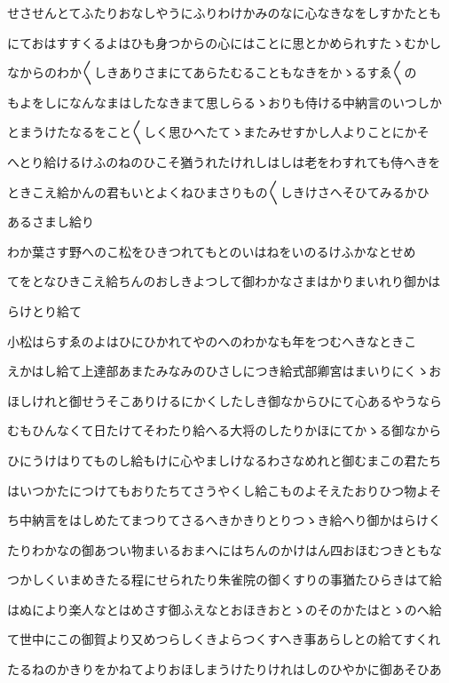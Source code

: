 \documentclass[a4paper,11pt,landscape]{ltjtarticle}
\begin{document}
せさせんとてふたりおなしやうにふりわけかみのなに心なきなをしすかたとも
\par\medskip
にておはすすくるよはひも身つからの心にはことに思とかめられすたゝむかし
\par\medskip
なからのわか〱しきありさまにてあらたむることもなきをかゝるすゑ〱の
\par\medskip
もよをしになんなまはしたなきまて思しらるゝおりも侍ける中納言のいつしか
\par\medskip
とまうけたなるをこと〱しく思ひへたてゝまたみせすかし人よりことにかそ
\par\medskip
へとり給けるけふのねのひこそ猶うれたけれしはしは老をわすれても侍へきを
\par\medskip
ときこえ給かんの君もいとよくねひまさりもの〱しきけさへそひてみるかひ
\par\medskip
あるさまし給り
\par\medskip
わか葉さす野へのこ松をひきつれてもとのいはねをいのるけふかなとせめ
\par\medskip
てをとなひきこえ給ちんのおしきよつして御わかなさまはかりまいれり御かは
\par\medskip
らけとり給て
\par\medskip
小松はらすゑのよはひにひかれてやのへのわかなも年をつむへきなときこ
\par\medskip
えかはし給て上達部あまたみなみのひさしにつき給式部卿宮はまいりにくゝお
\par\medskip
ほしけれと御せうそこありけるにかくしたしき御なからひにて心あるやうなら
\par\medskip
むもひんなくて日たけてそわたり給へる大将のしたりかほにてかゝる御なから
\par\medskip
ひにうけはりてものし給もけに心やましけなるわさなめれと御むまこの君たち
\par\medskip
はいつかたにつけてもおりたちてさうやくし給こものよそえたおりひつ物よそ
\par\medskip
ち中納言をはしめたてまつりてさるへきかきりとりつゝき給へり御かはらけく
\par\medskip
たりわかなの御あつい物まいるおまへにはちんのかけはん四おほむつきともな
\par\medskip
つかしくいまめきたる程にせられたり朱雀院の御くすりの事猶たひらきはて給
\par\medskip
はぬにより楽人なとはめさす御ふえなとおほきおとゝのそのかたはとゝのへ給
\par\medskip
て世中にこの御賀より又めつらしくきよらつくすへき事あらしとの給てすくれ
\par\medskip
たるねのかきりをかねてよりおほしまうけたりけれはしのひやかに御あそひあ
\end{document}
